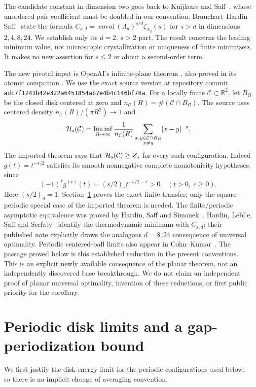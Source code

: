 \documentclass[11pt]{article}
\newcommand{\R}{\mathbb R}\newcommand{\Z}{\mathbb Z}
\newcommand{\abs}[1]{\lvert#1\rvert}\newcommand{\norm}[1]{\lVert#1\rVert}
\DeclareMathOperator{\covol}{covol}
\begin{document}
The candidate constant in dimension two goes back to Kuijlaars and
Saff~\cite[Conjecture 1]{KS1998}, whose unordered-pair coefficient must be
doubled in our convention; Brauchart--Hardin--Saff~\cite[Conjecture 2]{BHS2012}
state the formula $C_{s,d}=\covol(\Lambda_d)^{s/d}\zeta_{\Lambda_d}(s)$
for $s>d$ in dimensions $2,4,8,24$. We establish only its $d=2$, $s>2$
part. The result concerns the leading minimum value, not microscopic
crystallization or uniqueness of finite minimizers. It makes no new assertion
for $s\le2$ or about a second-order term.

The new pivotal input is OpenAI's infinite-plane theorem
\cite[Theorem 1.1]{OAIUniversal}, also proved in its atomic companion
\cite[Theorem 1.1]{OAIAtomic}. We use the exact source version at repository
commit \texttt{adc7f1241b42e322a6451854ab7e4b4c146bf78a}.
For a locally finite $\mathcal C\subset\R^2$, let $B_R$ be the closed disk
centered at zero and $n_{\mathcal C}(R)=\#(\mathcal C\cap B_R)$. The source
uses centered density $n_{\mathcal C}(R)/(\pi R^2)\to1$ and
\begin{equation}\label{eq:infinite}
 \Hs(\mathcal C)=\liminf_{R\to\infty}\frac1{n_{\mathcal C}(R)}
   \sum_{\substack{x,y\in\mathcal C\cap B_R\\x\ne y}}\abs{x-y}^{-s}.
\end{equation}
The imported theorem says that $\mathcal H_s(\mathcal C)\ge Z_s$ for every such
configuration. Indeed $g(t)=t^{-s/2}$ satisfies its smooth nonnegative
complete-monotonicity hypotheses, since
\[
 (-1)^r g^{(r)}(t)=(s/2)_r t^{-s/2-r}>0\quad(t>0,\ r\ge0).
\]
Here $(s/2)_0=1$. Section~\ref{sec:periodic} proves the exact finite transfer;
only the square-periodic special case of the imported theorem is needed.
The finite/periodic asymptotic equivalence was proved by Hardin, Saff and
Simanek~\cite[Theorem 3.2]{HSS2014}. Hardin, Lebl'e, Saff and
Serfaty~\cite[Proposition 3.1]{HLSS2018} identify the thermodynamic minimum
with $C_{s,d}$; their published note explicitly draws the analogous
$d=8,24$ consequence of universal optimality. Periodic centered-ball
limits also appear in Cohn--Kumar~\cite[Lemma 9.1]{CK2007}. The passage
proved below is this established reduction in the present conventions.
This is an explicit newly available consequence of the planar theorem,
not an independently discovered base breakthrough. We do not claim an
independent proof of planar universal optimality, invention of these
reductions, or first public priority for the corollary.

\section{Periodic disk limits and a gap-periodization bound}\label{sec:periodic}
We first justify the disk-energy limit for the periodic configurations used
below, so there is no implicit change of averaging convention.
\end{document}
